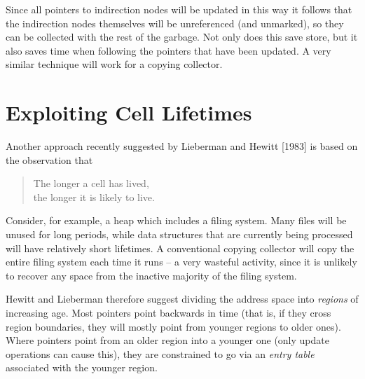 \begin{center}
{
        }%
    \end{center}

    Since all pointers to indirection nodes will be updated in this way it follows
    that the indirection nodes themselves will be unreferenced (and unmarked),
    so they can be collected with the rest of the garbage. Not only does this save
    store, but it also saves time when following the pointers that have been
    updated. A very similar technique will work for a copying collector.

    \section{Exploiting Cell Lifetimes}

    Another approach recently suggested by Lieberman and Hewitt [1983] is
    based on the observation that

    \begin{quote}
        \small
        The longer a cell has lived,\\
        the longer it is likely to live.
    \end{quote}

    \noindent
    Consider, for example, a heap which includes a filing system. Many files will
    be unused for long periods, while data structures that are currently being
    processed will have relatively short lifetimes. A conventional copying
    collector will copy the entire filing system each time it runs -- a very wasteful
    activity, since it is unlikely to recover any space from the inactive majority of
    the filing system.

    Hewitt and Lieberman therefore suggest dividing the address space into
    \textit{regions} of increasing age. Most pointers point backwards in time (that is, if
    they cross region boundaries, they will mostly point from younger regions to
    older ones). Where pointers point from an older region into a younger one
    (only update operations can cause this), they are constrained to go via an \textit{entry
        table} associated with the younger region.

